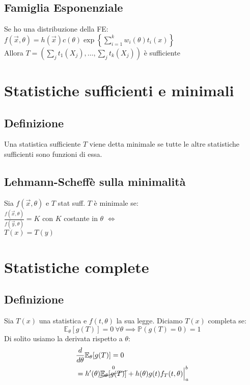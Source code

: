 \documentclass[a4paper,notitlepage]{report}%
\newcommand{\p}{\mathbb{P}} %
\newcommand{\E}{\mathbb{E}} %
\begin{document}
\begin{multicols*}{2}
    \subsection*{Famiglia Esponenziale}
    Se ho una distribuzione della FE:\\
    $f(\vec{x},\theta) = h(\vec{x}) c(\theta) \exp\left\{ \sum_{i=1}^k w_i(\theta) t_i(x) \right\}$ \\
    Allora $T=(\sum_j t_1(X_j), \dots, \sum_j t_k(X_j) )$ è sufficiente


\section*{Statistiche sufficienti e minimali}


    \subsection*{Definizione}
    Una statistica sufficiente $T$ viene detta minimale
    se tutte le altre statistiche sufficienti sono funzioni
    di essa.


    \subsection*{Lehmann-Scheffè sulla minimalità}
    Sia $f(\vec{x},\theta)$ e $T$ stat suff. $T$ è minimale se:\\
    $\frac{f(\vec{x},\theta)}{f(\vec{y},\theta)}=K$ con $K$ costante in $\theta$
    $\iff$ \\
    $T(x)=T(y)$


\section*{Statistiche complete}


    \subsection*{Definizione}
    Sia $T(x)$ una statistica e $f(t,\theta)$ la sua legge.
    Diciamo $T(x)$ completa se:
    \[
        \E_\theta[g(T)] = 0 \: \forall\theta \implies \p(g(T)=0)=1    
    \]
    Di solito usiamo la derivata rispetto a $\theta$:
    \begin{align*}
        & \frac{d}{d\theta} \E_\theta[g(T)] = 0 \\
        & = h'(\theta) \overset{0}{\cancel{\E_\theta[g(T)]}} + h(\theta)g(t)f_T(t,\theta) \Big|_a^b
    \end{align*}


\end{multicols*}
\end{document}
